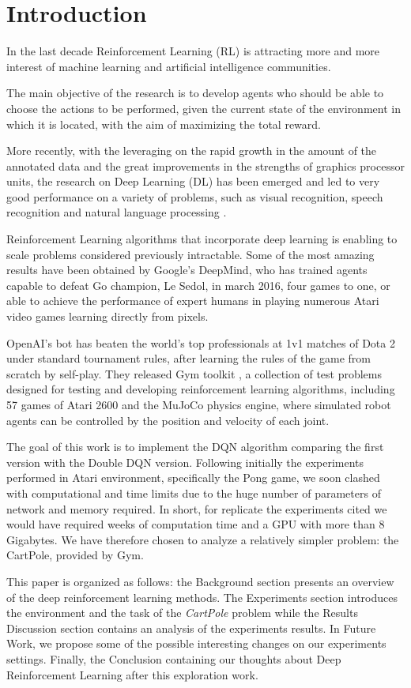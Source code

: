 \section{Introduction}

In the last decade Reinforcement Learning (RL) is attracting more and more interest of machine learning and artificial intelligence communities.

The main objective of the research is to develop agents who should be able to choose the actions to be performed, given the current state of the environment in which it is located, with the aim of maximizing the total reward.

More recently, with the leveraging on the rapid growth in the amount of the annotated data and the great improvements in the strengths of graphics processor units, the research on  Deep Learning (DL) has been emerged and led to very good performance on a variety of problems, such as visual recognition, speech recognition and natural language processing \cite{AdvancesCNN}.

Reinforcement Learning algorithms that incorporate deep learning is enabling to scale problems considered previously intractable. Some of the most amazing results have been obtained by Google’s DeepMind, who has trained agents capable to defeat Go champion, Le Sedol, in march 2016, four games to one, or able to achieve the performance of expert humans in playing numerous Atari video games learning directly from pixels.

OpenAI's bot has beaten the world's top professionals at 1v1 matches of Dota 2 under standard tournament rules, after learning the rules of the game from scratch by self-play.
They released Gym toolkit \cite{Gym}, a collection of test problems designed for testing and developing reinforcement learning algorithms, including 57 games of Atari 2600 and the MuJoCo physics engine, where simulated robot agents can be controlled by the position and velocity of each joint. 

The goal of this work is to implement the DQN algorithm comparing the first version with the Double DQN version. Following initially the experiments performed in Atari environment, specifically the Pong game, we soon clashed with computational and time limits due to the huge number of parameters of network and memory required. In short, for replicate the experiments cited we would have required weeks of computation time and a GPU with more than 8 Gigabytes. We have therefore chosen to analyze a relatively simpler problem: the CartPole, provided by Gym.

This paper is organized as follows: the Background section presents an overview of the deep reinforcement learning methods. The Experiments section introduces the environment and the task of the \textit{CartPole} problem while the Results Discussion section contains an analysis of the experiments results. In Future Work, we propose some of the possible interesting changes on our experiments settings. Finally, the Conclusion containing our thoughts about Deep Reinforcement Learning after this exploration work.
